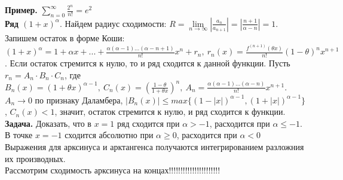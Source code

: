 \textbf{Пример.} $\sum\limits_{n=0}^{\infty} \frac{2^n}{n!}=e^2$\\
\textbf{Ряд $(1+x)^\alpha$}. Найдем радиус сходимости:
$R=\lim\limits_{n \to \infty} |\frac{a_n}{a_{n+1}}|=|\frac{n+1}{\alpha-n}|=1$.
Запишем остаток в форме Коши: $(1+x)^\alpha=1+\alpha x+...+\frac{\alpha
(\alpha-1)...(\alpha-n+1)}{n!}x^n+r_n,~r_n(x)=\frac{f^{(n+1)}(\theta x)}{n!}
(1-\theta)^nx^{n+1}$. Если остаток стремится к нулю, то и ряд сходится к 
данной функции. Пусть $r_n=A_n\cdot B_n\cdot C_n$, где $B_n(x)=(1+\theta x)^{
\alpha-1},~C_n(x)=\left( \frac{1-\theta}{1+\theta x} \right)^n,~A_n=
\frac{\alpha(\alpha-1)...(\alpha-n)}{n!}x^{n+1}$. $A_n\to0$ по признаку 
Даламбера, $|B_n(x)|\leqslant max \{(1-|x|)^{\alpha-1},(1+|x|)^{\alpha-1}\}$,
$C_n(x)<1$, значит, остаток стремится к нулю, и ряд сходится к функции.\\
\textbf{Задача.} Доказать, что в $x=1$ ряд сходится при $\alpha>-1$,
расходится при $\alpha\leqslant -1$. В точке $x=-1$ сходится абсолютно при
 $\alpha\geqslant0$, расходится при $\alpha<0$\\
Выражения для арксинуса и арктангенса получаются интегрированием разложния
их производных. \\
Рассмотрим сходимость арксинуса на концах!!!!!!!!!!!!!!!!!!!!!!





